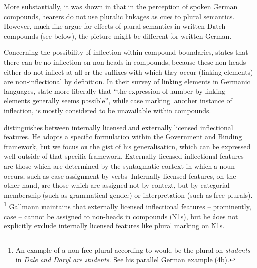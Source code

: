 More substantially, it was shown in \textcite{KoesterEa2004} that in the perception of spoken German compounds, hearers do not use pluralic linkages as cues to plural semantics.
However, much like \textcite{SchreuderEa1998} argue for effects of plural semantics in written Dutch compounds (see below), the picture might be different for written German.

Concerning the possibility of inflection within compound boundaries, \textcite[9]{Schluecker2012} states that there can be no inflection on non-heads in compounds, because these non-heads either do not inflect at all or the suffixes with which they occur (\ie linking elements) are non-inflectional by definition.
In their survey of linking elements in Germanic languages, \textcite[577]{FuhrhopKuerschner2015} state more liberally that ``the expression of number by linking elements generally seems possible'', while case marking, another instance of inflection, is mostly considered to be unavailable within compounds.

\textcite[178--180]{Gallmann1998} distinguishes between internally licensed and externally licensed inflectional features.
He adopts a specific formulation within the Government and Binding framework, but we focus on the gist of his generalisation, which can be expressed well outside of that specific framework.
Externally licensed inflectional features are those which are determined by the syntagmatic context in which a noun occurs, such as case assignment by verbs.
Internally licensed features, on the other hand, are those which are assigned not by context, but by categorial membership (such as grammatical gender) or interpretation (such as free plurals).%
\footnote{An example of a non-free plural according to \textcite[179]{Gallmann1998} would be the plural on \textit{students} in \textit{Dale and Daryl are students}.
See his parallel German example (4b).
}
Gallmann maintains that externally licensed inflectional features -- prominently, case -- cannot be assigned to non-heads in compounds (N1s), but he does not explicitly exclude internally licensed features like plural marking on N1s.


